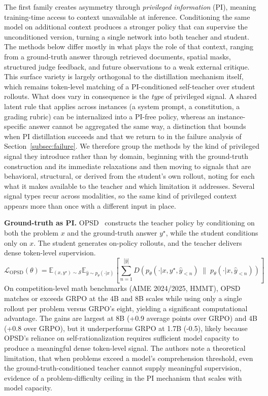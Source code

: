 \documentclass{article} %
\newcommand{\E}{\mathbb{E}}
\newcommand{\ptheta}{p_\theta}
\newcommand{\loss}{\mathcal{L}}
\begin{document}
The first family creates asymmetry through \emph{privileged information} (PI), meaning training-time access to context unavailable at inference. Conditioning the same model on additional context produces a stronger policy that can supervise the unconditioned version, turning a single network into both teacher and student. The methods below differ mostly in what plays the role of that context, ranging from a ground-truth answer through retrieved documents, spatial masks, structured judge feedback, and future observations to a weak external critique. This surface variety is largely orthogonal to the distillation mechanism itself, which remains token-level matching of a PI-conditioned self-teacher over student rollouts. What does vary in consequence is the \emph{type} of privileged signal. A shared latent rule that applies across instances (a system prompt, a constitution, a grading rubric) can be internalized into a PI-free policy, whereas an instance-specific answer cannot be aggregated the same way, a distinction that bounds when PI distillation succeeds and that we return to in the failure analysis of Section~\ref{subsec:failure}. We therefore group the methods by the kind of privileged signal they introduce rather than by domain, beginning with the ground-truth construction and its immediate relaxations and then moving to signals that are behavioral, structural, or derived from the student's own rollout, noting for each what it makes available to the teacher and which limitation it addresses. Several signal types recur across modalities, so the same kind of privileged context appears more than once with a different input in place.

\textbf{Ground-truth as PI.} OPSD~\citep{2601.18734} constructs the teacher policy by conditioning on both the problem $x$ and the ground-truth answer $y^\star$, while the student conditions only on $x$. The student generates on-policy rollouts, and the teacher delivers dense token-level supervision.
\begin{equation*}
    \loss_{\text{OPSD}}(\theta) = \E_{(x, y^\star) \sim \mathcal{S}} \E_{\hat{y} \sim \ptheta(\cdot|x)} \left[ \sum_{n=1}^{|\hat{y}|} D\!\left( p_\theta(\cdot|x, y^\star, \hat{y}_{<n}) \;\|\; \ptheta(\cdot|x, \hat{y}_{<n}) \right) \right]
\end{equation*}
On competition-level math benchmarks (AIME 2024/2025, HMMT), OPSD matches or exceeds GRPO at the 4B and 8B scales while using only a single rollout per problem versus GRPO's eight, yielding a significant computational advantage. The gains are largest at 8B (+0.9 average points over GRPO) and 4B (+0.8 over GRPO), but it underperforms GRPO at 1.7B (-0.5), likely because OPSD's reliance on self-rationalization requires sufficient model capacity to produce a meaningful dense token-level signal. The authors note a theoretical limitation, that when problems exceed a model's comprehension threshold, even the ground-truth-conditioned teacher cannot supply meaningful supervision, evidence of a problem-difficulty ceiling in the PI mechanism that scales with model capacity.
\end{document}
